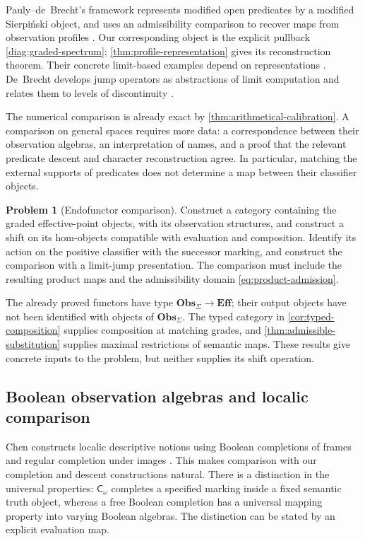 \documentclass[11pt,a4paper]{article}
\numberwithin{equation}{section}
\theoremstyle{definition}
\newtheorem{problem}[problem]{Problem}
\theoremstyle{remark}
\theoremstyle{plain}
\newcommand{\E}{\mathbf{Eff}}
\newcommand{\Cw}{\mathsf C_{\omega}}
\newcommand{\ObsCat}{\mathbf{Obs}_{\Sigma}}
\begin{document}
Pauly--de~Brecht's framework represents modified open predicates by a
modified Sierpi\'nski object, and uses an admissibility comparison to
recover maps from observation profiles \cite[Sections~2.1--2.3]{paulydebrecht}.
Our corresponding object is the explicit pullback
\eqref{diag:graded-spectrum}; \cref{thm:profile-representation} gives
its reconstruction theorem. Their concrete limit-based examples
depend on representations \cite[Section~3.1]{paulydebrecht}.
De~Brecht develops jump operators as abstractions of limit computation
and relates them to levels of discontinuity \cite{debrechtjump}.

The numerical comparison is already exact by
\cref{thm:arithmetical-calibration}. A comparison on general spaces
requires more data: a correspondence between their observation
algebras, an interpretation of names, and a proof that the relevant
predicate descent and character reconstruction agree. In particular,
matching the external supports of predicates does not determine a
map between their classifier objects.

\begin{problem}[Endofunctor comparison]
\label{prob:jump-comparison}
Construct a category containing the graded effective-point objects,
with its observation structures, and construct a shift on its
hom-objects compatible with evaluation and composition. Identify its
action on the positive classifier with the successor marking, and
construct the comparison with a limit-jump presentation. The comparison
must include the resulting product maps and the admissibility domain
\eqref{eq:product-admission}.
\end{problem}

The already proved functors have type $\ObsCat\to\E$; their output
objects have not been identified with objects of $\ObsCat$. The typed
category in \cref{cor:typed-composition} supplies composition at
matching grades, and \cref{thm:admissible-substitution} supplies
maximal restrictions of semantic maps. These results give concrete
inputs to the problem, but neither supplies its shift operation.

\subsection{Boolean observation algebras and localic comparison}

Chen constructs localic descriptive notions using Boolean completions
of frames and regular completion under images \cite{chen}. This
makes comparison with our completion and descent constructions natural.
There is a distinction in the universal properties: $\Cw$ completes a
specified marking inside a fixed semantic truth object, whereas a free
Boolean completion has a universal mapping property into varying
Boolean algebras. The distinction can be stated by an explicit
evaluation map.
\end{document}
